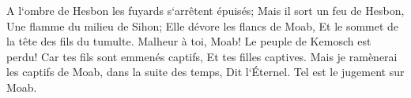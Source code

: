 \verse A l`ombre de Hesbon les fuyards s`arrêtent épuisés; Mais il sort un feu de Hesbon, Une flamme du milieu de Sihon; Elle dévore les flancs de Moab, Et le sommet de la tête des fils du tumulte. 
\verse Malheur à toi, Moab! Le peuple de Kemosch est perdu! Car tes fils sont emmenés captifs, Et tes filles captives. 
\verse Mais je ramènerai les captifs de Moab, dans la suite des temps, Dit l`Éternel. Tel est le jugement sur Moab. 

\chapter{}

